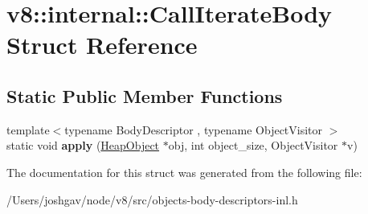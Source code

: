 \hypertarget{structv8_1_1internal_1_1_call_iterate_body}{}\section{v8\+:\+:internal\+:\+:Call\+Iterate\+Body Struct Reference}
\label{structv8_1_1internal_1_1_call_iterate_body}
\subsection*{Static Public Member Functions}
\begin{DoxyCompactItemize}
\item 
{\footnotesize template$<$typename Body\+Descriptor , typename Object\+Visitor $>$ }\\static void {\bfseries apply} (\hyperlink{classv8_1_1internal_1_1_heap_object}{Heap\+Object} $\ast$obj, int object\+\_\+size, Object\+Visitor $\ast$v)\hypertarget{structv8_1_1internal_1_1_call_iterate_body_ad6ecf1ee6ba6f46ddde84d06504b93bd}{}\label{structv8_1_1internal_1_1_call_iterate_body_ad6ecf1ee6ba6f46ddde84d06504b93bd}

\end{DoxyCompactItemize}


The documentation for this struct was generated from the following file\+:\begin{DoxyCompactItemize}
\item 
/\+Users/joshgav/node/v8/src/objects-\/body-\/descriptors-\/inl.\+h\end{DoxyCompactItemize}
